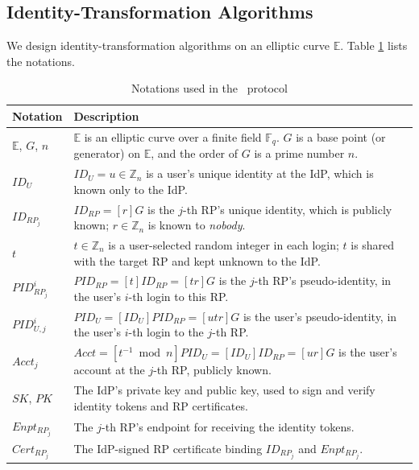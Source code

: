 \subsection{Identity-Transformation Algorithms}
\label{subsec:overview}

We design identity-transformation algorithms 
on an elliptic curve $\mathbb{E}$.
Table \ref{tbl:notations-protocol} lists the notations.


\begin{table}[tb]
\footnotesize
    \caption{Notations used in the \usso\ protocol}
    \centering
    \begin{tabular}{|p{0.93cm}|p{6.71cm}|} \hline
    {\textbf{Notation}} & {\textbf{Description}} \\ \hline
    {$\mathbb{E}$, $G$, $n$} & {$\mathbb{E}$ is an elliptic curve over a finite field $\mathbb{F}_q$. $G$ is a base point (or generator) on $\mathbb{E}$, and the order of $G$ is a prime number $n$.} \\ \hline
    {$ID_U$} & {$ID_U = u \in \mathbb{Z}_n$ is a user's unique identity at the IdP, which is known only to the IdP.} \\ \hline
   {$ID_{RP_j}$} & {$ID_{RP} = [r]G$ is the $j$-th RP's unique identity, which is publicly known; $r \in \mathbb{Z}_n$ is known to \emph{nobody}.} \\ \hline
    {$t$} & {$t \in \mathbb{Z}_n$ is a user-selected random integer in each login; $t$ is shared with the target RP and kept unknown to the IdP.} \\ \hline
    {$PID_{RP_j}^i$} & {$PID_{RP} = [t]{ID_{RP}} = [tr]G$ is the $j$-th RP's pseudo-identity, in the user's $i$-th login to this RP.} \\ \hline
    {$PID_{U,j}^i$} & {$PID_U = [{ID_U}]{PID_{RP}} = [utr]G$ is the user's pseudo-identity, in the user's $i$-th login to the $j$-th RP.} \\ \hline
     {$Acct_j$} & {$Acct = [t^{-1}\bmod n]PID_{U} = [ID_U]ID_{RP} = [ur]G$ is the user's account at the $j$-th RP, publicly known.} \\ \hline
    {$SK$, $PK$} & {The IdP's private key and public key, used to sign and verify identity tokens and RP certificates.} \\ \hline
    {$Enpt_{RP_j}$} & {The $j$-th RP's endpoint for receiving the identity tokens.} \\ \hline
    {$Cert_{RP_j}$} & {The IdP-signed RP certificate binding $ID_{RP_j}$ and $Enpt_{RP_j}$.} \\ \hline
    \end{tabular}
    \label{tbl:notations-protocol}
\end{table}

